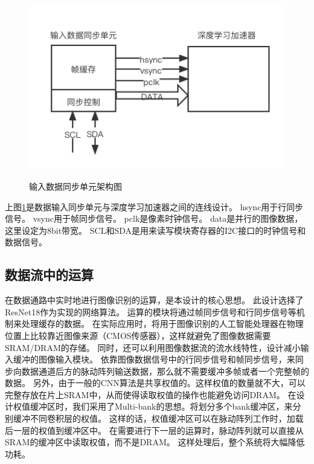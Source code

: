 \begin{figure}[htbp]
    \centering
    \includegraphics[width=12cm,height=8cm]{figures/input_data_adapter.png}
    \caption{输入数据同步单元架构图}
    \label{fig:input_data_adapter}
\end{figure}

上图\ref{fig:input_data_adapter}是数据输入同步单元与深度学习加速器之间的连线设计。
hsync用于行同步信号。
vsync用于帧同步信号。
pclk是像素时钟信号。
data是并行的图像数据，这里设定为8bit带宽。
SCL和SDA是用来读写模块寄存器的I2C接口的时钟信号和数据信号。


\subsection{数据流中的运算}

在数据通路中实时地进行图像识别的运算，是本设计的核心思想。
此设计选择了ResNet18作为实现的网络算法。
运算的模块将通过帧同步信号和行同步信号等机制来处理缓存的数据。
在实际应用时，将用于图像识别的人工智能处理器在物理位置上比较靠近图像来源（CMOS传感器），这样就避免了图像数据需要SRAM/DRAM的存储。
同时，还可以利用图像数据流的流水线特性，设计减小输入缓冲的图像输入模块。
依靠图像数据信号中的行同步信号和帧同步信号，来同步向数据通道后方的脉动阵列输送数据，那么就不需要缓冲多帧或者一个完整帧的数据。
另外，由于一般的CNN算法是共享权值的。这样权值的数量就不大，可以完整存放在片上SRAM中，从而使得读取权值的操作也能避免访问DRAM。
在设计权值缓冲区时，我们采用了Multi-bank的思想。将划分多个bank缓冲区，来分别缓冲不同卷积层的权值。
这样的话，权值缓冲区可以在脉动阵列工作时，加载后一层的权值到缓冲区中。
在需要进行下一层的运算时，脉动阵列就可以直接从SRAM的缓冲区中读取权值，而不是DRAM。
这样处理后，整个系统将大幅降低功耗。

